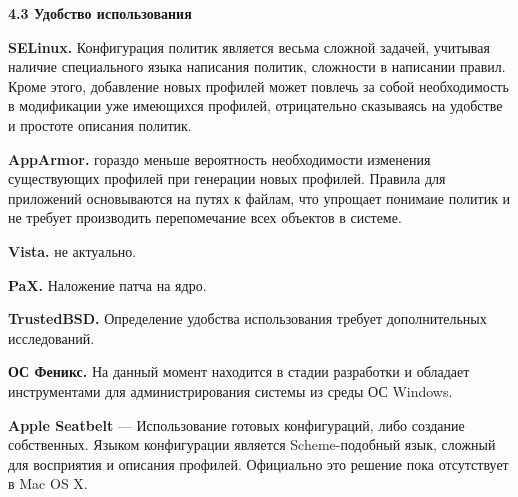 
\bigskip
{\bfseries 4.3 Удобство использования}

\bigskip
{\bfseries SELinux.} Конфигурация политик является весьма сложной задачей, учитывая наличие специального языка написания политик, сложности в написании правил. Кроме этого, добавление новых профилей может повлечь за собой необходимость в модификации уже имеющихся профилей, отрицательно сказываясь на удобстве и простоте описания политик. 

\bigskip
{\bfseries AppArmor.} гораздо меньше вероятность необходимости изменения существующих профилей при генерации новых профилей. Правила для приложений основываются на путях к файлам, что упрощает понимаие политик и не требует производить перепомечание всех объектов в системе. 

\bigskip
{\bfseries Vista.} не актуально. 

\bigskip
{\bfseries PaX.} Наложение патча на ядро. 

\bigskip
{\bfseries TrustedBSD.} Определение удобства использования требует дополнительных исследований. 

\bigskip
{\bfseries ОС Феникс.} На данный момент находится в стадии разработки и обладает инструментами для администрирования системы из среды ОС Windows. 

{\bfseries Apple Seatbelt} — Использование готовых конфигураций, либо создание собственных. Языком конфигурации является Scheme-подобный язык, сложный для восприятия и описания профилей. Официально это решение пока отсутствует в Mac OS X.

